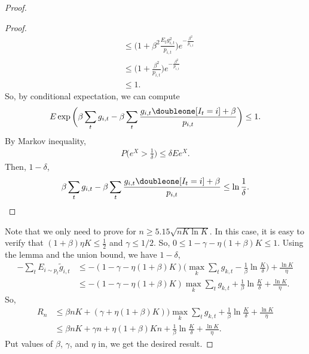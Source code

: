 \begin{proof}
\begin{proof}
\begin{align}
            &\le\Bigg(1+\beta^2 \frac{E_t g_{i,t}^2}{p_{i,t}}\Bigg)e^{-\frac{\beta^2}{p_{i,t}}} \\
            &\le\Bigg(1+ \frac{\beta^2}{p_{i,t}}\Bigg)e^{-\frac{\beta^2}{p_{i,t}}} \\
            &\le 1.
        \end{align}
        So, by conditional expectation, we can compute
        \begin{align}
            E \exp\bigg(\beta\sum_t g_{i,t}-\beta\sum_t\frac{g_{i,t}\doubleone[I_t=i]+\beta}{p_{i,t}}\bigg)\le 1.
        \end{align}
        By Markov inequality,
        \begin{align}
            P\bigg(e^X>\frac{1}{\delta}\bigg) \le \delta E e^X.
        \end{align}
        Then, \wprob $1-\delta$,
        \begin{align}
            \beta\sum_t g_{i,t}-\beta\sum_t\frac{g_{i,t}\doubleone[I_t=i]+\beta}{p_{i,t}}\le\ln \frac{1}{\delta}.
        \end{align}
    \end{proof}
    Note that we only need to prove for $n\ge5.15\sqrt{nK\ln K}$.
    In this case, it is easy to verify that
    $(1+\beta)\eta K\le\frac{1}{2}$ and $\gamma\le 1/2$.
    So, $0\le 1-\gamma-\eta(1+\beta)K\le 1$.
    Using the lemma and the union bound,
    we have \wprob $1-\delta$,
    \begin{align}
        -\sum_t E_{i\sim p_t}\tilde g_{i, t}
            &\le -(1-\gamma-\eta(1+\beta)K)\bigg(\max_k\sum_t g_{k,t} -\frac{1}{\beta}\ln\frac{K}{\delta} \bigg)+ \frac{\ln K}{\eta} \\
            &\le -(1-\gamma-\eta(1+\beta)K)\max_k\sum_t g_{k,t} +\frac{1}{\beta}\ln\frac{K}{\delta}+ \frac{\ln K}{\eta}.
    \end{align}
    So,
    \begin{align}
        R_n
            &\le\beta nK + (\gamma+\eta(1+\beta)K))\max_k\sum_t g_{k,t}+\frac{1}{\beta}\ln\frac{K}{\delta}+ \frac{\ln K}{\eta} \\
            &\le \beta nK + \gamma n+\eta(1+\beta)Kn+\frac{1}{\beta}\ln\frac{K}{\delta}+ \frac{\ln K}{\eta}.
    \end{align}
    Put values of $\beta$, $\gamma$, and $\eta$ in,
    we get the desired result.
\end{proof}
